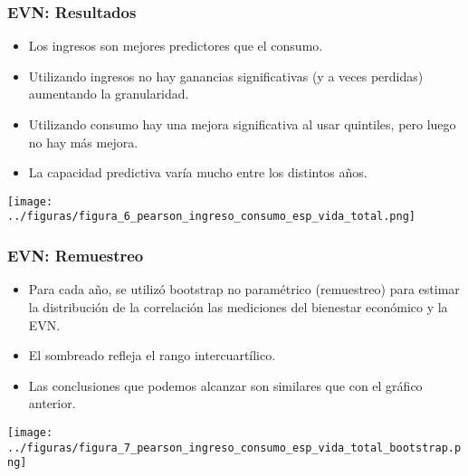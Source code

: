 \documentclass[10pt,mathserif]{beamer}%
\begin{document}
\begin{frame}
    \frametitle{EVN: Resultados}
    \begin{multicols}{2}
        \begin{minipage}{\linewidth}
            \begin{itemize}
                \item Los ingresos son mejores predictores que el consumo.
                \item Utilizando ingresos no hay ganancias significativas (y a veces perdidas) aumentando la granularidad.
                \item Utilizando consumo hay una mejora significativa al usar quintiles, pero luego no hay más mejora.
                \item La capacidad predictiva varía mucho entre los distintos años.
            \end{itemize}\end{minipage}
        \begin{minipage}{\linewidth}
            \centering
            \texttt{[image: ../figuras/figura\_6\_pearson\_ingreso\_consumo\_esp\_vida\_total.png]} %
        \end{minipage}

    \end{multicols}
\end{frame}

\begin{frame}
    \frametitle{EVN: Remuestreo}
    \begin{multicols}{2}
        \begin{minipage}{\linewidth}
            \begin{itemize}
                \item Para cada año, se utilizó bootstrap no paramétrico (remuestreo) para estimar la distribución de la correlación las mediciones del bienestar económico y la EVN.
            
                \item El sombreado refleja el rango intercuartílico. 

                \item Las conclusiones que podemos alcanzar son similares que con el gráfico anterior.
            \end{itemize}\end{minipage}
        \begin{minipage}{\linewidth}
            \centering
            \texttt{[image: ../figuras/figura\_7\_pearson\_ingreso\_consumo\_esp\_vida\_total\_bootstrap.png]} %
        \end{minipage}

    \end{multicols}

\end{frame}
\end{document}
